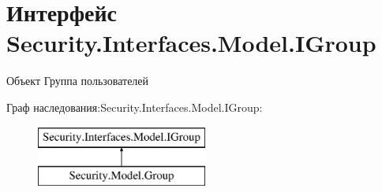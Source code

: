 \hypertarget{interface_security_1_1_interfaces_1_1_model_1_1_i_group}{}\section{Интерфейс Security.\+Interfaces.\+Model.\+I\+Group}
\label{interface_security_1_1_interfaces_1_1_model_1_1_i_group}


Объект Группа пользователей  


Граф наследования\+:Security.\+Interfaces.\+Model.\+I\+Group\+:\begin{figure}[H]
\begin{center}
\leavevmode
\includegraphics[height=2.000000cm]{d5/dbe/interface_security_1_1_interfaces_1_1_model_1_1_i_group}
\end{center}
\end{figure}
